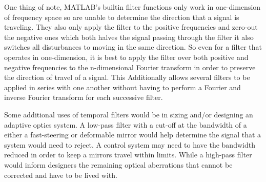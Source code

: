 One thing of note, MATLAB's builtin filter functions only work in one-dimension of frequency space so are unable to determine the direction that a signal is traveling.
They also only apply the filter to the positive frequencies and zero-out the negative ones which both halves the signal passing through the filter it also switches all disturbances to moving in the same direction.
So even for a filter that operates in one-dimension, it is best to apply the filter over both positive and negative frequencies to the n-dimensional Fourier transform in order to preserve the direction of travel of a signal.
This Additionally allows several filters to be applied in series with one another without having to perform a Fourier and inverse Fourier transform for each successive filter.

Some additional uses of temporal filters would be in sizing and/or designing an adaptive optics system.
A low-pass filter with a cut-off at the bandwidth of a either a fast-steering or deformable mirror would help determine the signal that a system would need to reject.
A control system may need to have the bandwidth reduced in order to keep a mirrors travel within limits.
While a high-pass filter would inform designers the remaining optical aberrations that cannot be corrected and have to be lived with.




